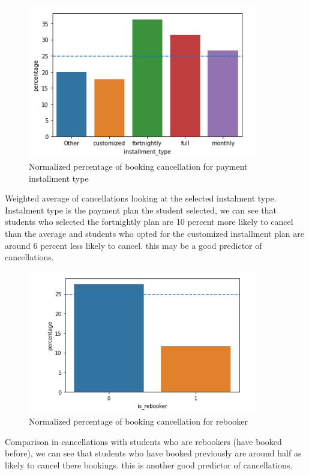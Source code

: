   \begin{figure}[hbt!]
\includegraphics[width=10cm]{figures/instalment_type.png}
 \caption{Normalized percentage of booking cancellation for payment installment type}
\end{figure}
  
  
  Weighted average of cancellations looking at the selected instalment type. Instalment type is the payment plan the student selected, we can see that students who selected the fortnightly plan are 10 percent more likely to cancel than the average and students who opted for the customized installment plan are around 6 percent less likely to cancel. this may be a good predictor of cancellations.
  
  
   \begin{figure}[hbt!]
\includegraphics[width=10cm]{figures/is_rebooker.png}
 \caption{Normalized percentage of booking cancellation for rebooker}
\end{figure}
  
 Comparison in cancellations with students who are rebookers (have booked before), we can see that students who have booked previously are around half as likely to cancel there bookings. this is another good predictor of cancellations.  
  

